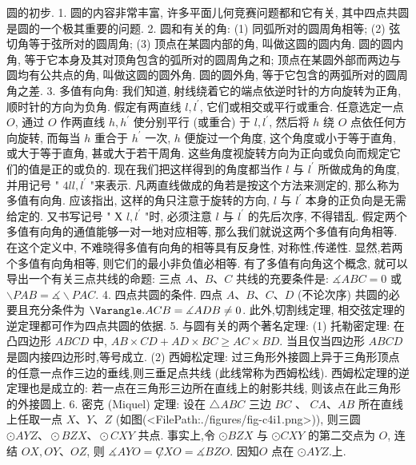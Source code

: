 
圆的初步.
1. 圆的内容非常丰富, 许多平面儿何竞赛问题都和它有关, 其中四点共圆是圆的一个极其重要的问题.
2. 圆和有关的角:
(1) 同弧所对的圆周角相等;
(2) 弦切角等于弦所对的圆周角;
(3) 顶点在某圆内部的角, 叫做这圆的圆内角.
圆的圆内角, 等于它本身及其对顶角包含的弧所对的圆周角之和; 顶点在某圆外部而两边与圆均有公共点的角, 叫做这圆的圆外角.
圆的圆外角, 等于它包含的两弧所对的圆周角之差.
3. 多值有向角: 我们知道, 射线绕着它的端点依逆时针的方向旋转为正角, 顺时针的方向为负角.
假定有两直线 $l, l^{\prime}$, 它们或相交或平行或重合.
任意选定一点 $O$, 通过 $O$ 作两直线 $h, h^{\prime}$ 使分别平行 (或重合) 于 $l, l^{\prime}$, 然后将 $h$ 绕 $O$ 点依任何方向旋转, 而每当 $h$ 重合于 $h^{\prime}$ 一次, $h$ 便旋过一个角度, 这个角度或小于等于直角, 或大于等于直角, 甚或大于若干周角.
这些角度视旋转方向为正向或负向而规定它们的值是正的或负的.
现在我们把这样得到的角度都当作 $l$ 与 $l^{\prime}$ 所做成角的角度, 并用记号 " $4 l l, l^{\prime}$ "来表示.
凡两直线做成的角若是按这个方法来测定的, 那么称为多值有向角.
应该指出, 这样的角只注意于旋转的方向, $l$ 与 $l^{\prime}$ 本身的正负向是无需给定的.
又书写记号 " Х $l, l^{\prime}$ "时, 必须注意 $l$ 与 $l^{\prime}$ 的先后次序, 不得错乱.
假定两个多值有向角的通值能够一对一地对应相等, 那么我们就说这两个多值有向角相等.
在这个定义中, 不难晓得多值有向角的相等具有反身性, 对称性,传递性.
显然,若两个多值有向角相等, 则它们的最小非负值必相等.
有了多值有向角这个概念, 就可以导出一个有关三点共线的命题: 三点 $A 、 B 、 C$ 共线的充要条件是: $\measuredangle A B C=0$ 或 $\backslash P A B=\measuredangle \backslash P A C$.
4. 四点共圆的条件.
四点 $A 、 B 、 C 、 D$ (不论次序) 共圆的必要且充分条件为 $\Varangle . A C B= \measuredangle A D B \neq 0$.
此外,切割线定理, 相交弦定理的逆定理都可作为四点共圆的依据.
5. 与圆有关的两个著名定理:
(1) 托勒密定理: 在凸四边形 $A B C D$ 中, $A B \times C D+A D \times B C \geqslant A C \times B D$. 当且仅当四边形 $A B C D$ 是圆内接四边形时,等号成立.
(2) 西姆松定理: 过三角形外接圆上异于三角形顶点的任意一点作三边的垂线,则三垂足点共线 (此线常称为西姆松线).
西姆松定理的逆定理也是成立的: 若一点在三角形三边所在直线上的射影共线, 则该点在此三角形的外接圆上.
6. 密克 (Miquel) 定理: 设在 $\triangle A B C$ 三边 $B C$ 、 $C A 、 A B$ 所在直线上任取一点 $X 、 Y 、 Z$ (如图(<FilePath:./figures/fig-c4i1.png>)), 则三圆 $\odot A Y Z 、 \odot B Z X 、 \odot C X Y$ 共点.
事实上,令 $\odot B Z X$ 与 $\odot C X Y$ 的第二交点为 $O$, 连结 $O X, O Y 、 O Z$, 则 $\measuredangle A Y O=\not C X O=\measuredangle B Z O$. 因知$O$ 点在 $\odot A Y Z$.上.



